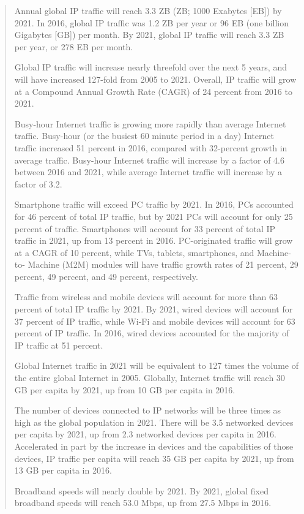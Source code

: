 \begin{quotation}
Annual global IP traffic will reach 3.3 ZB (ZB; 1000 Exabytes [EB])
by 2021. In 2016, global IP traffic was 1.2 ZB per year or 96 EB (one billion
Gigabytes [GB]) per month. By 2021, global IP traffic will reach 3.3 ZB per
year, or 278 EB per month.

Global IP traffic will increase nearly threefold over the next 5 years, and
will have increased 127-fold from 2005 to 2021. Overall, IP traffic will grow
at a Compound Annual Growth Rate (CAGR) of 24 percent from 2016 to
2021.

Busy-hour Internet traffic is growing more rapidly than average Internet
traffic. Busy-hour (or the busiest 60 minute period in a day) Internet traffic
increased 51 percent in 2016, compared with 32-percent growth in average
traffic. Busy-hour Internet traffic will increase by a factor of 4.6 between
2016 and 2021, while average Internet traffic will increase by a factor of 3.2.

Smartphone traffic will exceed PC traffic by 2021. In 2016, PCs
accounted for 46 percent of total IP traffic, but by 2021 PCs will account for
only 25 percent of traffic. Smartphones will account for 33 percent of total
IP traffic in 2021, up from 13 percent in 2016. PC-originated traffic will grow
at a CAGR of 10 percent, while TVs, tablets, smartphones, and Machine-to-
Machine (M2M) modules will have traffic growth rates of 21 percent,
29 percent, 49 percent, and 49 percent, respectively.

Traffic from wireless and mobile devices will account for more than
63 percent of total IP traffic by 2021. By 2021, wired devices will account
for 37 percent of IP traffic, while Wi-Fi and mobile devices will account for
63 percent of IP traffic. In 2016, wired devices accounted for the majority of
IP traffic at 51 percent.

Global Internet traffic in 2021 will be equivalent to 127 times the volume
of the entire global Internet in 2005. Globally, Internet traffic will reach
30 GB per capita by 2021, up from 10 GB per capita in 2016.

The number of devices connected to IP networks will be three times as
high as the global population in 2021. There will be 3.5 networked devices
per capita by 2021, up from 2.3 networked devices per capita in 2016.
Accelerated in part by the increase in devices and the capabilities of those
devices, IP traffic per capita will reach 35 GB per capita by 2021, up from
13 GB per capita in 2016.

Broadband speeds will nearly double by 2021. By 2021, global fixed
broadband speeds will reach 53.0 Mbps, up from 27.5 Mbps in 2016.
\end{quotation}

